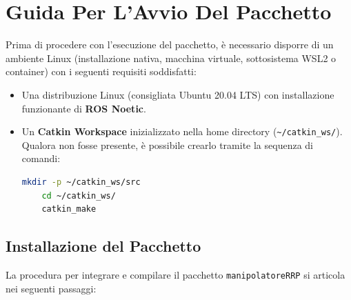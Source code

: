 \documentclass[11pt, a4paper]{report}
\begin{document}
\section{Guida Per L'Avvio Del Pacchetto}
\label{sec:guida_avvio}

Prima di procedere con l'esecuzione del pacchetto, è necessario disporre di un ambiente Linux (installazione nativa, macchina virtuale, sottosistema WSL2 o container) con i seguenti requisiti soddisfatti:
\begin{itemize}
    \item Una distribuzione Linux (consigliata Ubuntu 20.04 LTS) con installazione funzionante di \textbf{ROS Noetic}.
    \item Un \textbf{Catkin Workspace} inizializzato nella home directory (\texttt{\textasciitilde/catkin\_ws/}). Qualora non fosse presente, è possibile crearlo tramite la sequenza di comandi:
    \begin{lstlisting}[language=bash]
    mkdir -p ~/catkin_ws/src
    cd ~/catkin_ws/
    catkin_make
    \end{lstlisting}
\end{itemize}

\subsection{Installazione del Pacchetto}
La procedura per integrare e compilare il pacchetto \texttt{manipolatoreRRP} si articola nei seguenti passaggi:
\end{document}
